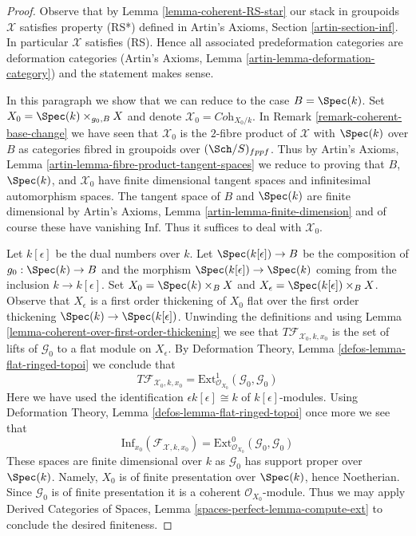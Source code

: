 \begin{proof}
Observe that by Lemma \ref{lemma-coherent-RS-star}
our stack in groupoids $\mathcal{X}$ satisfies property (RS*)
defined in Artin's Axioms, Section \ref{artin-section-inf}.
In particular $\mathcal{X}$ satisfies (RS).
Hence all associated predeformation
categories are deformation categories
(Artin's Axioms, Lemma \ref{artin-lemma-deformation-category})
and the statement makes sense.

\medskip\noindent
In this paragraph we show that we can reduce to the case $B = \Spec(k)$.
Set $X_0 = \Spec(k) \times_{g_0, B} X$
and denote $\mathcal{X}_0 = \textit{Coh}_{X_0/k}$. In
Remark \ref{remark-coherent-base-change} we have seen that
$\mathcal{X}_0$ is the $2$-fibre product of $\mathcal{X}$ with
$\Spec(k)$ over $B$ as categories fibred in groupoids over
$(\Sch/S)_{fppf}$. Thus by
Artin's Axioms, Lemma \ref{artin-lemma-fibre-product-tangent-spaces}
we reduce to proving that $B$, $\Spec(k)$, and $\mathcal{X}_0$
have finite dimensional tangent spaces and infinitesimal automorphism
spaces. The tangent space of $B$ and $\Spec(k)$ are finite dimensional by
Artin's Axioms, Lemma \ref{artin-lemma-finite-dimension}
and of course these have vanishing $\text{Inf}$.
Thus it suffices to deal with $\mathcal{X}_0$.

\medskip\noindent
Let $k[\epsilon]$ be the dual numbers over $k$.
Let $\Spec(k[\epsilon]) \to B$ be the composition of $g_0 : \Spec(k) \to B$
and the morphism $\Spec(k[\epsilon]) \to \Spec(k)$
coming from the inclusion $k \to k[\epsilon]$.
Set $X_0 = \Spec(k) \times_B X$ and
$X_\epsilon = \Spec(k[\epsilon]) \times_B X$.
Observe that $X_\epsilon$ is a first order thickening of $X_0$
flat over the first order thickening $\Spec(k) \to \Spec(k[\epsilon])$.
Unwinding the definitions and using
Lemma \ref{lemma-coherent-over-first-order-thickening}
we see that $T\mathcal{F}_{\mathcal{X}_0, k, x_0}$ is the set of
lifts of $\mathcal{G}_0$ to a flat module on $X_\epsilon$.
By Deformation Theory, Lemma \ref{defos-lemma-flat-ringed-topoi}
we conclude that
$$
T\mathcal{F}_{\mathcal{X}_0, k, x_0} =
\text{Ext}^1_{\mathcal{O}_{X_0}}(\mathcal{G}_0, \mathcal{G}_0)
$$
Here we have used the identification $\epsilon k[\epsilon] \cong k$
of $k[\epsilon]$-modules. Using
Deformation Theory, Lemma \ref{defos-lemma-flat-ringed-topoi}
once more we see that
$$
\text{Inf}_{x_0}(\mathcal{F}_{\mathcal{X}, k, x_0}) =
\text{Ext}^0_{\mathcal{O}_{X_0}}(\mathcal{G}_0, \mathcal{G}_0)
$$
These spaces are finite dimensional over $k$ as $\mathcal{G}_0$
has support proper over $\Spec(k)$. Namely, $X_0$ is of finite presentation
over $\Spec(k)$, hence Noetherian. Since $\mathcal{G}_0$ is of finite
presentation it is a coherent $\mathcal{O}_{X_0}$-module. Thus we may apply
Derived Categories of Spaces, Lemma
\ref{spaces-perfect-lemma-compute-ext}
to conclude the desired finiteness.
\end{proof}

